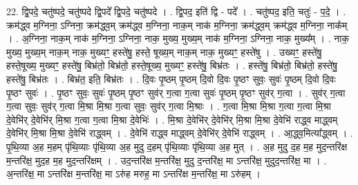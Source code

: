 \documentclass[17pt]{extarticle}
\begin{document}
22. द्वि॒पदे॒ चतु॑ष्पदे॒ चतु॑ष्पदे द्वि॒पदे᳚ द्वि॒पदे॒ चतु॑ष्पदे । . द्वि॒पद॒ इति॑ द्वि - पदे᳚ । . चतु॑ष्पद॒ इति॒ चतुः॑ - प॒दे॒ । . क्रम॑द्ध्व म॒ग्निना॒ ऽग्निना॒ क्रम॑द्ध्व॒म् क्रम॑द्ध्व म॒ग्निना॒ नाक॒म् नाक॑ म॒ग्निना॒ क्रम॑द्ध्व॒म् क्रम॑द्ध्व म॒ग्निना॒ नाक᳚म् । . अ॒ग्निना॒ नाक॒म् नाक॑ म॒ग्निना॒ ऽग्निना॒ नाक॒ मुख्य॒ मुख्य॒म् नाक॑ म॒ग्निना॒ ऽग्निना॒ नाक॒ मुख्य᳚म् । . नाक॒ मुख्य॒ मुख्य॒म् नाक॒म् नाक॒ मुख्यꣳ॒॒ हस्ते॑षु॒ हस्ते॒ षूख्य॒म् नाक॒म् नाक॒ मुख्यꣳ॒॒ हस्ते॑षु । . उख्यꣳ॒॒ हस्ते॑षु॒ हस्ते॒षूख्य॒ मुख्यꣳ॒॒ हस्ते॑षु॒ बिभ्र॑तो॒ बिभ्र॑तो॒ हस्ते॒षूख्य॒ मुख्यꣳ॒॒ हस्ते॑षु॒ बिभ्र॑तः । . हस्ते॑षु॒ बिभ्र॑तो॒ बिभ्र॑तो॒ हस्ते॑षु॒ हस्ते॑षु॒ बिभ्र॑तः । . बिभ्र॑त॒ इति॒ बिभ्र॑तः । . दि॒वः पृ॒ष्ठम् पृ॒ष्ठम् दि॒वो दि॒वः पृ॒ष्ठꣳ सुवः॒ सुवः॑ पृ॒ष्ठम् दि॒वो दि॒वः पृ॒ष्ठꣳ सुवः॑ । . पृ॒ष्ठꣳ सुवः॒ सुवः॑ पृ॒ष्ठम् पृ॒ष्ठꣳ सुव॑र् ग॒त्वा ग॒त्वा सुवः॑ पृ॒ष्ठम् पृ॒ष्ठꣳ सुव॑र् ग॒त्वा । . सुव॑र् ग॒त्वा ग॒त्वा सुवः॒ सुव॑र् ग॒त्वा मि॒श्रा मि॒श्रा ग॒त्वा सुवः॒ सुव॑र् ग॒त्वा मि॒श्राः । . ग॒त्वा मि॒श्रा मि॒श्रा ग॒त्वा ग॒त्वा मि॒श्रा दे॒वेभि॑र् दे॒वेभि॑र् मि॒श्रा ग॒त्वा ग॒त्वा मि॒श्रा दे॒वेभिः॑ । . मि॒श्रा दे॒वेभि॑र् दे॒वेभि॑र् मि॒श्रा मि॒श्रा दे॒वेभि॑ राद्ध्व माद्ध्वम् दे॒वेभि॑र् मि॒श्रा मि॒श्रा दे॒वेभि॑ राद्ध्वम् । . दे॒वेभि॑ राद्ध्व माद्ध्वम् दे॒वेभि॑र् दे॒वेभि॑ राद्ध्वम् । . आ॒द्ध्व॒मित्या᳚द्ध्वम् । . पृ॒थि॒व्या अ॒ह म॒हम् पृ॑थि॒व्याः पृ॑थि॒व्या अ॒ह मुदु द॒हम् पृ॑थि॒व्याः पृ॑थि॒व्या अ॒ह मुत् । . अ॒ह मुदु द॒ह म॒ह मुद॒न्तरि॑क्ष म॒न्तरि॑क्ष॒ मुद॒ह म॒ह मुद॒न्तरि॑क्षम् । . उद॒न्तरि॑क्ष म॒न्तरि॑क्ष॒ मुदु द॒न्तरि॑क्ष॒ मा ऽन्तरि॑क्ष॒ मुदुद॒न्तरि॑क्ष॒ मा । . अ॒न्तरि॑क्ष॒ मा ऽन्तरि॑क्ष म॒न्तरि॑क्ष॒ मा ऽरु॑ह मरुह॒ मा ऽन्तरि॑क्ष म॒न्तरि॑क्ष॒ मा ऽरु॑हम् । \newline
\end{document}
